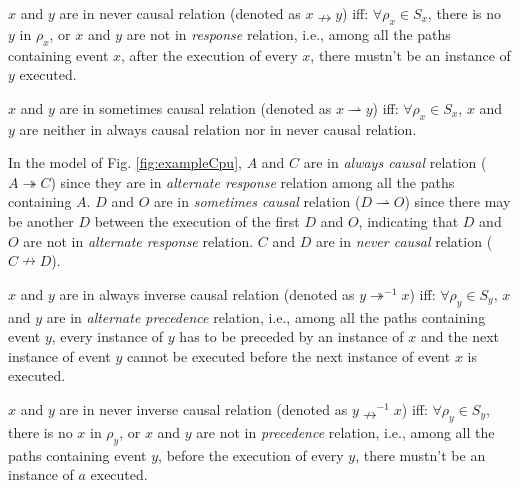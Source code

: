 \documentclass{llncs}
\begin{document}
\begin{definition}\label{def:neverCausal}
$x$ and $y$ are in never causal relation (denoted as $x\nrightarrow y$) iff: $\forall\rho_{x}\in S_{x}$, there is no $y$ in $\rho_{x}$, or $x$ and $y$ are not in \textit{response} relation, i.e., among all the paths containing event $x$, after the execution of every $x$, there mustn't be an instance of $y$ executed.
\end{definition}

\begin{definition}\label{def:sometimesCausal}
$x$ and $y$ are in sometimes causal relation (denoted as $x\rightharpoonup y$) iff: $\forall\rho_{x}\in S_{x}$, $x$ and $y$ are neither in always causal relation nor in never causal relation.
\end{definition}

\begin{example}\label{ex:causalRelation}
In the model of Fig. \ref{fig:exampleCpu}, $A$ and $C$ are in \textit{always causal} relation ($A\twoheadrightarrow C$) since they are in \textit{alternate response} relation among all the paths containing $A$. $D$ and $O$ are in \textit{sometimes causal} relation ($D\rightharpoonup O$) since there may be another $D$ between the execution of the first $D$ and $O$, indicating that $D$ and $O$ are not in \textit{alternate response} relation. $C$ and $D$ are in \textit{never causal} relation ($C\nrightarrow D$).
\end{example}

\begin{definition}\label{def:alwaysInverseCausal}
$x$ and $y$ are in always inverse causal relation (denoted as $y\twoheadrightarrow^{-1}x$) iff: $\forall\rho_{y}\in S_{y}$, $x$ and $y$ are in \textit{alternate precedence} relation, i.e., among all the paths containing event $y$, every instance of $y$ has to be preceded by an instance of $x$ and the next instance of event $y$ cannot be executed before the next instance of event $x$ is executed.
\end{definition}

\begin{definition}\label{def:neverInverseCausal}
$x$ and $y$ are in never inverse causal relation (denoted as $y\nrightarrow^{-1}x$) iff: $\forall\rho_{y}\in S_{y}$, there is no $x$ in $\rho_{y}$, or $x$ and $y$ are not in \textit{precedence} relation, i.e., among all the paths containing event $y$, before the execution of every $y$, there mustn't be an instance of $a$ executed.
\end{definition}
\end{document}
